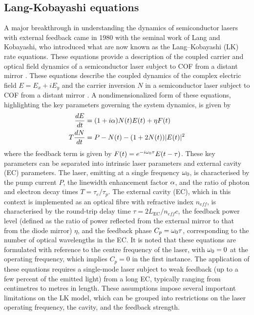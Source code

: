 \subsection*{Lang-Kobayashi equations}
A major breakthrough in understanding the dynamics of semiconductor lasers with external feedback came in 1980 with the seminal work of Lang and Kobayashi, who introduced what are now known as the Lang–Kobayashi (LK) rate equations. 
These equations provide a description of the coupled carrier and optical field dynamics of a semiconductor laser subject to COF from a distant mirror \cite{lang1980external}.
These equations describe the coupled dynamics of the complex electric field $E = E_x + iE_y$ and the carrier inversion $N$ in a semiconductor laser subject to COF from a distant mirror \cite{lang1980external}.
A nondimensionalized form of these equations, highlighting the key parameters governing the system dynamics, is given by \cite{heil2003delay}
%
\begin{equation}
\label{eq:LK}
    \begin{aligned}
        \frac{d E}{d t} & =(1+i \alpha) N(t) E(t)+\eta F(t) \\
        T \frac{d N}{d t} & =P-N(t)-(1+2 N(t))|E(t)|^2
    \end{aligned}
\end{equation}
%
where the feedback term is given by $F(t) = e^{-i \omega_0 \tau} E(t-\tau)$. 
These key parameters can be separated into intrinsic laser parameters and external cavity (EC) parameters. 
The laser, emitting at a single frequency $\omega_0$, is characterised by the pump current $P$, the linewidth enhancement factor $\alpha$, and the ratio of photon and electron decay times $T = \tau_e/\tau_p$. 
The external cavity (EC), which in this context is implemented as an optical fibre with refractive index $n_{eff}$, is characterised by the round-trip delay time $\tau = 2L_\text{EC}/n_{eff} c$, the feedback power level (defined as the ratio of power reflected from the external mirror to that from the diode mirror) $\eta$, and the feedback phase $C_p = \omega_0 \tau$, corresponding to the number of optical wavelengths in the EC.
It is noted that these equations are formulated with reference to the centre frequency of the laser, with $\omega_0 = 0$ at the operating frequency, which implies $C_p = 0$ in the first instance. 
The application of these equations requires a single-mode laser subject to weak feedback (up to a few percent of the emitted light) from a long EC, typically ranging from centimetres to metres in length. 
These assumptions impose several important limitations on the LK model, which can be grouped into restrictions on the laser operating frequency, the cavity, and the feedback strength.
